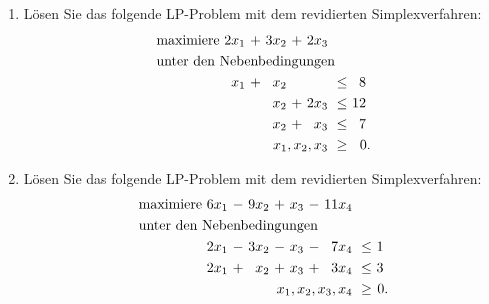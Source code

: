 \documentclass[11pt, a4paper]{article}
\begin{document}
\begin{enumerate}[\bfseries A:]
\begin{enumerate}[\bfseries 1.]

\item Lösen Sie das folgende LP-Problem mit dem revidierten Simplexverfahren:
\begin{align*}
\begin{alignedat}{5}
& \text{maximiere } & 2x_1 &\ + &\ 3x_2 &\ + &\ 2x_3 & & \\
& \rlap{unter den Nebenbedingungen} & & & & & & & \\
&&  x_1 &\ + &\ x_2 &\   &\      &\ \leq &\  8\ \\
&&      &\   &\ x_2 &\ + &\ 2x_3 &\ \leq &\ 12\ \\
&&      &\   &\ x_2 &\ + &\  x_3 &\ \leq &\  7\ \\
&&&&&& \llap{$x_1,x_2,x_3$} &\ \geq &\ 0.
\end{alignedat}
\end{align*}

\item Lösen Sie das folgende LP-Problem mit dem revidierten Simplexverfahren:
\begin{align*}
\begin{alignedat}{6}
& \text{maximiere } & 6x_1 &\ - &\ 9x_2 &\ + &\ x_3 &\ - &\ 11x_4 & & \\
& \rlap{unter den Nebenbedingungen} & & & & & & & & & \\
&& 2x_1 &\ - &\ 3x_2 &\ - &\ x_3 &\ - &\ 7x_4 &\ \leq &\  1\ \\
&& 2x_1 &\ + &\  x_2 &\ + &\ x_3 &\ + &\ 3x_4 &\ \leq &\  3\ \\
&&&&&&&& \llap{$x_1,x_2,x_3,x_4$} &\ \geq &\ 0.
\end{alignedat}
\end{align*}

\end{enumerate}


\end{enumerate}
\end{document}
